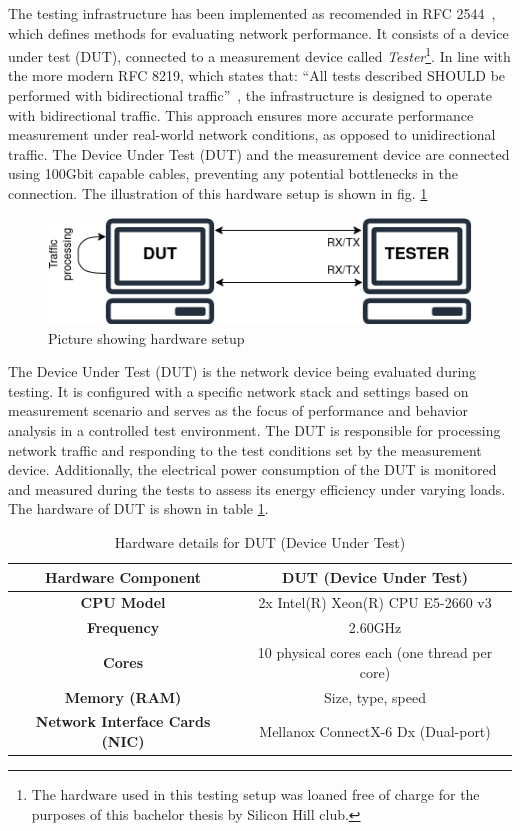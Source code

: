 The testing infrastructure has been implemented as recomended in RFC 2544~\cite{rfc2544}, which defines methods for evaluating network performance. 
It consists of a device under test (DUT), connected to a measurement device called \textit{Tester}\footnote{The hardware used in this testing setup was loaned free of charge for the purposes of this bachelor thesis by Silicon Hill club.}.
In line with the more modern RFC 8219, which states that: ``All tests described SHOULD be performed with bidirectional traffic''~\cite{RFC8219}, the infrastructure is designed to operate with bidirectional traffic. 
This approach ensures more accurate performance measurement under real-world network conditions, as opposed to unidirectional traffic.
The Device Under Test (DUT) and the measurement device are connected using 100Gbit capable cables, preventing any potential bottlenecks in the connection.
The illustration of this hardware setup is shown in fig. \ref{fig:hardware-setup}

\begin{figure}[!htbp]
    \centering
    \includegraphics[width=0.9\linewidth]{images/setup.png}
    \caption{Picture showing hardware setup}
    \label{fig:hardware-setup}
\end{figure}

The Device Under Test (DUT) is the network device being evaluated during testing. 
It is configured with a specific network stack and settings based on measurement scenario 
and serves as the focus of performance and behavior analysis in a controlled test environment. 
The DUT is responsible for processing network traffic and responding to the test conditions set by the measurement device.
Additionally, the electrical power consumption of the DUT is monitored and measured during the tests to assess its energy efficiency under varying loads.
The hardware of DUT is shown in table \ref{tab:hardware_dut}.

\begin{table}[h!]
\centering
\caption{Hardware details for DUT (Device Under Test)}
\begin{tabular}{|c|c|}
\hline
\textbf{Hardware Component} & \textbf{DUT (Device Under Test)} \\
\hline
\textbf{CPU Model} & 2x Intel(R) Xeon(R) CPU E5-2660 v3 \\
\hline
\textbf{Frequency} & 2.60GHz \\
\hline
\textbf{Cores} & 10 physical cores each (one thread per core) \\
\hline
\textbf{Memory (RAM)} & Size, type, speed \\
\hline
\textbf{Network Interface Cards (NIC)} & Mellanox ConnectX-6 Dx (Dual-port) \\
\hline
\end{tabular}
\label{tab:hardware_dut}
\end{table}

